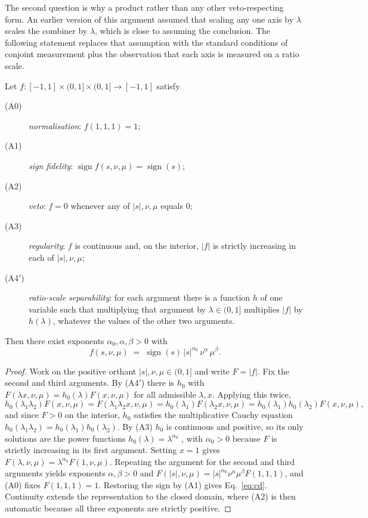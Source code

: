 The second question is why a product rather than any other veto-respecting form.
An earlier version of this argument assumed that scaling any one axis by
$\lambda$ scales the combiner by $\lambda$, which is close to assuming the
conclusion. The following statement replaces that assumption with the standard
conditions of conjoint measurement \citep{debreu1960,gorman1968,krantz1971} plus
the observation that each axis is measured on a ratio scale.

\begin{proposition}[Representation]\label{prop:rep}
Let $f:[-1,1]\times(0,1]\times(0,1]\to[-1,1]$ satisfy
\begin{description}
\item[(A0)] \emph{normalisation}: $f(1,1,1)=1$;
\item[(A1)] \emph{sign fidelity}: $\operatorname{sign}f(s,\nu,\mu)=\operatorname{sign}(s)$;
\item[(A2)] \emph{veto}: $f=0$ whenever any of $|s|,\nu,\mu$ equals $0$;
\item[(A3)] \emph{regularity}: $f$ is continuous and, on the interior,
  $|f|$ is strictly increasing in each of $|s|,\nu,\mu$;
\item[(A4$'$)] \emph{ratio-scale separability}: for each argument there is a
  function $h$ of one variable such that multiplying that argument by
  $\lambda\in(0,1]$ multiplies $|f|$ by $h(\lambda)$, whatever the values of the
  other two arguments.
\end{description}
Then there exist exponents $\alpha_0,\alpha,\beta>0$ with
\begin{equation}\label{eq:cd}
f(s,\nu,\mu)\;=\;\operatorname{sign}(s)\,|s|^{\alpha_0}\,\nu^{\alpha}\,\mu^{\beta}.
\end{equation}
\end{proposition}

\begin{proof}
Work on the positive orthant $|s|,\nu,\mu\in(0,1]$ and write $F=|f|$. Fix the
second and third arguments. By (A4$'$) there is $h_0$ with
$F(\lambda x,\nu,\mu)=h_0(\lambda)F(x,\nu,\mu)$ for all admissible
$\lambda,x$. Applying this twice,
\[
h_0(\lambda_1\lambda_2)F(x,\nu,\mu)=F(\lambda_1\lambda_2 x,\nu,\mu)
 =h_0(\lambda_1)F(\lambda_2x,\nu,\mu)=h_0(\lambda_1)h_0(\lambda_2)F(x,\nu,\mu),
\]
and since $F>0$ on the interior, $h_0$ satisfies the multiplicative Cauchy
equation $h_0(\lambda_1\lambda_2)=h_0(\lambda_1)h_0(\lambda_2)$. By (A3) $h_0$ is
continuous and positive, so its only solutions are the power functions
$h_0(\lambda)=\lambda^{\alpha_0}$ \citep{aczel1966}, with $\alpha_0>0$ because
$F$ is strictly increasing in its first argument. Setting $x=1$ gives
$F(\lambda,\nu,\mu)=\lambda^{\alpha_0}F(1,\nu,\mu)$. Repeating the argument for
the second and third arguments yields exponents $\alpha,\beta>0$ and
$F(|s|,\nu,\mu)=|s|^{\alpha_0}\nu^{\alpha}\mu^{\beta}F(1,1,1)$, and (A0) fixes
$F(1,1,1)=1$. Restoring the sign by (A1) gives Eq.~\eqref{eq:cd}. Continuity
extends the representation to the closed domain, where (A2) is then automatic
because all three exponents are strictly positive.
\end{proof}

